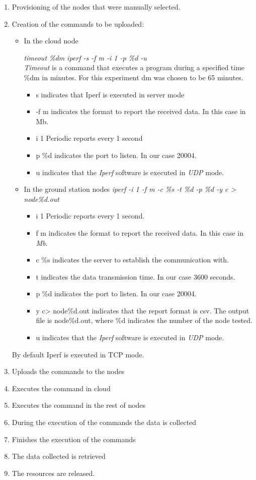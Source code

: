 \begin{enumerate}
\item Provisioning of the nodes that were manually selected.
\item Creation of the commands to be uploaded:
\begin{itemize}
\item In the cloud node

\emph{timeout \%dm iperf -s -f m -i 1 -p \%d -u} \\
\emph{Timeout} is a command that executes a program during a specified time \%dm in
minutes. For this experiment dm was chosen to be 65 minutes.
\begin{itemize}
\item s indicates that Iperf is executed in server mode
\item -f m indicates the format to report the received data. In this case in Mb.  
\item i 1 Periodic reports every 1 second
\item p \%d indicates the port to listen. In our case 20004.
\item u indicates that the \emph{Iperf} software is executed in \emph{UDP} mode.
\end{itemize}

\item In the ground station nodes
\emph{iperf  -i 1 -f m -c \%s -t \%d -p \%d  -y c > node\%d.out}\\
\begin{itemize}
\item i 1 Periodic reports every 1 second.
\item f m indicates the format to report the received data. In this case in \emph{Mb}.
\item c \%s indicates the server to establish the communication with.
\item t indicates the data transmission time. In our case 3600 seconds.
\item p \%d indicates the port to listen. In our case 20004.
\item y c> node\%d.out indicates that the report format is csv. The output file
  is node\%d.out, where \%d indicates the number of the node tested.
\item u indicates that the \emph{Iperf} software is executed in \emph{UDP} mode.
\end{itemize}
\end{itemize}

By default Iperf is executed in TCP mode.

\item Uploads the commands to the nodes
\item Executes the command in cloud
\item Executes the command in the rest of nodes
\item During the execution of the commands the data is collected
\item Finishes the execution of the commands 
\item The data collected is retrieved 
\item The resources are released.
\end{enumerate}

